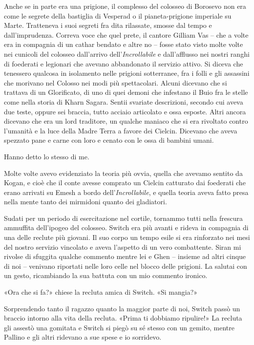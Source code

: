 Anche se in parte era una prigione, il complesso del colosseo di
Borosevo non era come le segrete della bastiglia di Vesperad o il
pianeta-prigione imperiale su Marte. Tratteneva i suoi segreti fra dita
rilassate, smosse dal tempo e dall'imprudenza. Correva voce che quel
prete, il cantore Gilliam Vas -- che a volte era in compagnia di un
cathar bendato e altre no -- fosse stato visto molte volte nei cunicoli
del colosseo dall'arrivo dell'\emph{Incrollabile} e dall'afflusso nei
nostri ranghi di foederati e legionari che avevano abbandonato il
servizio attivo. Si diceva che tenessero qualcosa in isolamento nelle
prigioni sotterranee, fra i folli e gli assassini che morivano nel
Colosso nei modi più spettacolari. Alcuni dicevano che si trattava di un
Glorificato, di uno di quei demoni che infestano il Buio fra le stelle
come nella storia di Kharn Sagara. Sentii svariate descrizioni, secondo
cui aveva due teste, oppure sei braccia, tutto acciaio articolato e ossa
esposte. Altri ancora dicevano che era un lord traditore, un qualche
maniaco che si era rivoltato contro l'umanità e la luce della Madre
Terra a favore dei Cielcin. Dicevano che aveva spezzato pane e carne con
loro e cenato con le ossa di bambini umani.

Hanno detto lo stesso di me.

Molte volte avevo evidenziato la teoria più ovvia, quella che avevamo
sentito da Kogan, e cioè che il conte avesse comprato un Cielcin
catturato dai foederati che erano arrivati su Emesh a bordo
dell'\emph{Incrollabile}, e quella teoria aveva fatto presa nella mente
tanto dei mirmidoni quanto dei gladiatori.

Sudati per un periodo di esercitazione nel cortile, tornammo tutti nella
frescura ammuffita dell'ipogeo del colosseo. Switch era più avanti e
rideva in compagnia di una delle reclute più giovani. Il suo corpo un
tempo esile si era rinforzato nei mesi del nostro servizio vincolato e
aveva l'aspetto di un vero combattente. Siran mi rivolse di sfuggita
qualche commento mentre lei e Ghen -- insieme ad altri cinque di noi --
venivano riportati nelle loro celle nel blocco delle prigioni. La
salutai con un gesto, ricambiando la sua battuta con un mio commento
ironico.

«Ora che si fa?» chiese la recluta amica di Switch. «Si mangia?»

Sorprendendo tanto il ragazzo quanto la maggior parte di noi, Switch
passò un braccio intorno alla vita della recluta. «Prima ti dobbiamo
ripulire!» La recluta gli assestò una gomitata e Switch si piegò su sé
stesso con un gemito, mentre Pallino e gli altri ridevano a sue spese e
io sorridevo.

